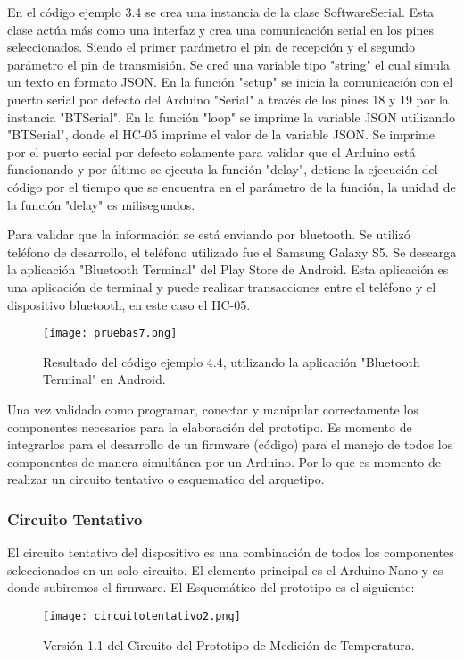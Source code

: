 \par \noindent
En el código ejemplo 3.4 se crea una instancia de la clase SoftwareSerial. Esta clase actúa más como una interfaz y crea una comunicación serial en los pines seleccionados. Siendo el primer parámetro el pin de recepción y el segundo parámetro el pin de transmisión. Se creó una variable tipo "string" el cual simula un texto en formato JSON. En la función "setup" se inicia la comunicación con el puerto serial por defecto del Arduino "Serial" a través de los pines 18 y 19 por la instancia "BTSerial". En la función "loop" se imprime la variable JSON utilizando "BTSerial", donde el HC-05 imprime el valor de la variable JSON. Se imprime por el puerto serial por defecto solamente para validar que el Arduino está funcionando y por último se ejecuta la función "delay", detiene la ejecución del código por el tiempo que se encuentra en el parámetro de la función, la unidad de la función "delay" es milisegundos. 

\par \noindent
Para validar que la información se está enviando por bluetooth. Se utilizó teléfono de desarrollo, el teléfono utilizado fue el Samsung Galaxy S5. Se descarga la aplicación "Bluetooth Terminal"\cite{btterminal} del Play Store de Android. Esta aplicación es una aplicación de terminal y puede realizar transacciones entre el teléfono y el dispositivo bluetooth\cite{btterminal}, en este caso el HC-05.


\begin{figure}[H]
	\centering
	\texttt{[image: pruebas7.png]}
	\caption{Resultado del código ejemplo 4.4, utilizando la aplicación "Bluetooth Terminal" en Android.}
\end{figure}

\par \noindent
Una vez validado como programar, conectar y manipular correctamente los componentes necesarios para la elaboración del prototipo. Es momento de integrarlos para el desarrollo de un firmware (código) para el manejo de todos los componentes de manera simultánea por un Arduino. Por lo que es momento de realizar un circuito tentativo o esquematico del arquetipo.

\subsubsection{Circuito Tentativo}
\par 
El circuito tentativo del dispositivo es una combinación de todos los componentes seleccionados en un solo circuito. El elemento principal es el Arduino Nano y es donde subiremos el firmware. El Esquemático del prototipo es el siguiente:

\begin{figure}[H]
	\centering
	\texttt{[image: circuitotentativo2.png]}
	\caption{Versión 1.1 del Circuito del Prototipo de Medición de Temperatura.}
\end{figure}
